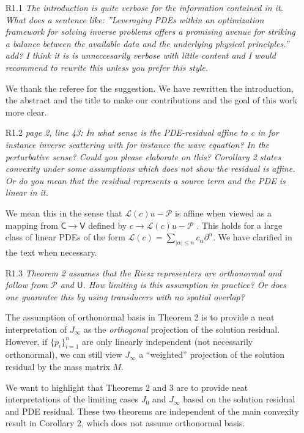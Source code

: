 \documentclass[11pt]{article}
\newcommand{\mycomment}[1]{\textit{\color{bluey}#1}}
\begin{document}
\begin{enumerate}[parsep=1em,leftmargin=1em]
\item[R1.1] \mycomment{The introduction is quite verbose for the information contained in it. What does a sentence like: ”Leveraging
PDEs within an optimization framework for solving inverse problems offers a promising avenue for striking a balance between the available data and the underlying physical principles.” add?
I think it is is unneccesarily verbose with little content and I would recommend to rewrite this unless you prefer this style.}

We thank the referee for the suggestion. We have rewritten the introduction, the abstract and the title to make our contributions and the goal of this work more clear.

\item[R1.2] \mycomment{page 2, line 43: In what sense is the PDE-residual affine to c in for instance inverse scattering with for instance
the wave equation? In the perturbative sense? Could you please elaborate on this? Corollary 2 states convexity
under some assumptions which does not show the residual is affine. Or do you mean that the residual represents
a source term and the PDE is linear in it.}

We mean this in the sense that $\mathcal{L}(c)u-\mathcal{P}$ is affine when viewed as a mapping from $\mathsf{C}\rightarrow\mathsf{V}$ defined by $c\rightarrow \mathcal{L}(c)u-\mathcal{P}$ . This holds for a large class of linear PDEs of the form $\mathcal{L}(c) = \sum_{|\alpha|\leq n} c_{\alpha}\partial^\alpha$. We have clarified in the text when necessary.

\item[R1.3] \mycomment{Theorem 2 assumes that the Riesz representers are orthonormal and follow from $\mathcal{P}$ and $\mathsf{U}$. How limiting is this
assumption in practice? Or does one guarantee this by using transducers with no spatial overlap?} 

The assumption of orthonormal basis in Theorem 2  is to provide a neat interpretation of $J_\infty$ as the \textit{orthogonal} projection of the solution residual. However, if $\{p_i\}_{i=1}^n$ are only linearly independent (not necessarily orthonormal), we can still view  $J_\infty$ a ``weighted'' projection of the solution residual by the mass matrix $M$.

We want to highlight that Theorems 2 and 3 are to provide neat interpretations of the limiting cases $J_0$ and $J_\infty$ based on the solution residual and PDE residual. These two theorems are independent of the main convexity result in Corollary 2, which does not assume orthonormal basis.


\end{enumerate}
\end{document}

